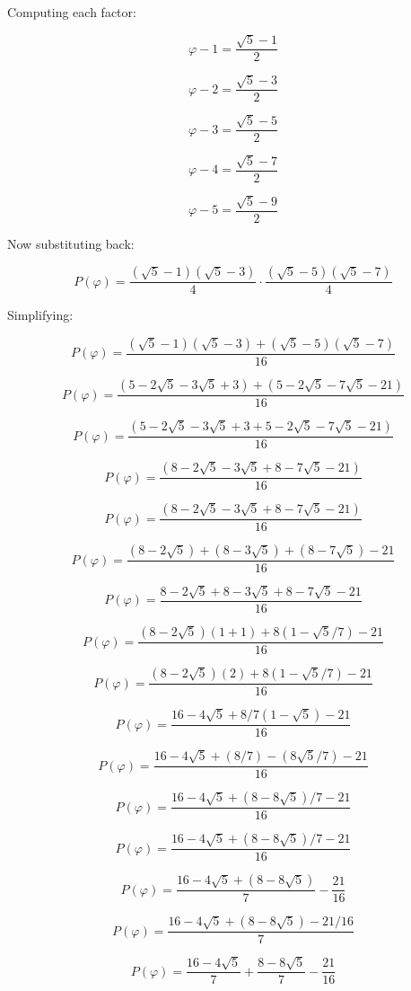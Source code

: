 \documentclass{article}
\begin{document}
Computing each factor:

\[
\varphi - 1 = \frac{\sqrt{5}-1}{2}
\]

\[
\varphi - 2 = \frac{\sqrt{5}-3}{2}
\]

\[
\varphi - 3 = \frac{\sqrt{5}-5}{2}
\]

\[
\varphi - 4 = \frac{\sqrt{5}-7}{2}
\]

\[
\varphi - 5 = \frac{\sqrt{5}-9}{2}
\]

Now substituting back:

\[
P(\varphi) = \frac{(\sqrt{5}-1)(\sqrt{5}-3)}{4} \cdot \frac{(\sqrt{5}-5)(\sqrt{5}-7)}{4}
\]

Simplifying:

\[
P(\varphi) = \frac{(\sqrt{5}-1)(\sqrt{5}-3) + (\sqrt{5}-5)(\sqrt{5}-7)}{16}
\]

\[
P(\varphi) = \frac{(5 - 2\sqrt{5} - 3\sqrt{5} + 3) + (5 - 2\sqrt{5} - 7\sqrt{5} - 21)}{16}
\]

\[
P(\varphi) = \frac{(5 - 2\sqrt{5} - 3\sqrt{5} + 3 + 5 - 2\sqrt{5} - 7\sqrt{5} - 21)}{16}
\]

\[
P(\varphi) = \frac{(8 - 2\sqrt{5} - 3\sqrt{5} + 8 - 7\sqrt{5} - 21)}{16}
\]

\[
P(\varphi) = \frac{(8 - 2\sqrt{5} - 3\sqrt{5} + 8 - 7\sqrt{5} - 21)}{16}
\]

\[
P(\varphi) = \frac{(8 - 2\sqrt{5}) + (8 - 3\sqrt{5}) + (8 - 7\sqrt{5}) - 21}{16}
\]

\[
P(\varphi) = \frac{8 - 2\sqrt{5} + 8 - 3\sqrt{5} + 8 - 7\sqrt{5} - 21}{16}
\]

\[
P(\varphi) = \frac{(8 - 2\sqrt{5})(1 + 1) + 8(1 - \sqrt{5}/7) - 21}{16}
\]

\[
P(\varphi) = \frac{(8 - 2\sqrt{5})(2) + 8(1 - \sqrt{5}/7) - 21}{16}
\]

\[
P(\varphi) = \frac{16 - 4\sqrt{5} + 8/7(1 - \sqrt{5}) - 21}{16}
\]

\[
P(\varphi) = \frac{16 - 4\sqrt{5} + (8/7) - (8\sqrt{5}/7) - 21}{16}
\]

\[
P(\varphi) = \frac{16 - 4\sqrt{5} + (8 - 8\sqrt{5})/7 - 21}{16}
\]

\[
P(\varphi) = \frac{16 - 4\sqrt{5} + (8 - 8\sqrt{5})/7 - 21}{16}
\]

\[
P(\varphi) = \frac{16 - 4\sqrt{5} + (8 - 8\sqrt{5})}{7} - \frac{21}{16}
\]

\[
P(\varphi) = \frac{16 - 4\sqrt{5} + (8 - 8\sqrt{5}) - 21/16}{7}
\]

\[
P(\varphi) = \frac{16 - 4\sqrt{5}}{7} + \frac{8 - 8\sqrt{5}}{7} - \frac{21}{16}
\]
\end{document}

